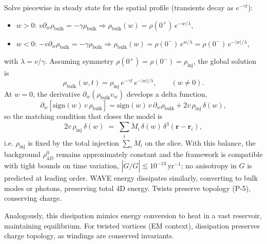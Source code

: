 Solve piecewise in steady state for the spatial profile (transients decay as $e^{-\gamma t}$):
\begin{itemize}
\item $w>0$: $v\partial_w\rho_{\text{bulk}}=-\gamma\rho_{\text{bulk}}\Rightarrow \rho_{\text{bulk}}(w)=\rho(0^+)\,e^{-w/\lambda}$,
\item $w<0$: $-v\partial_w\rho_{\text{bulk}}=-\gamma\rho_{\text{bulk}}\Rightarrow \rho_{\text{bulk}}(w)=\rho(0^-)\,e^{w/\lambda}=\rho(0^-)\,e^{-|w|/\lambda}$,
\end{itemize}
with $\lambda=v/\gamma$. Assuming symmetry $\rho(0^+)=\rho(0^-)=\rho_{\text{inj}}$, the global solution is
\begin{equation}
\rho_{\text{bulk}}(w,t)=\rho_{\text{inj}}\,e^{-\gamma t}\,e^{-|w|/\lambda},\qquad (w\neq 0).
\end{equation}
At $w=0$, the derivative $\partial_w(\rho_{\text{bulk}} v_w)$ develops a delta function,
\begin{equation}
\partial_w\!\left[\mathrm{sign}(w)\,v\,\rho_{\text{bulk}}\right]
= \mathrm{sign}(w)\,v\,\partial_w\rho_{\text{bulk}} + 2v\,\rho_{\text{inj}}\,\delta(w),
\end{equation}
so the matching condition that closes the model is
\begin{equation}
2v\,\rho_{\text{inj}}\,\delta(w)\;=\;\sum_i \dot M_i\,\delta(w)\,\delta^3(\mathbf r-\mathbf r_i),
\end{equation}
i.e. $\rho_{\text{inj}}$ is fixed by the total injection $\sum_i\dot M_i$ on the slice. With this balance, the background $\rho_{4D}^0$ remains approximately constant and the framework is compatible with tight bounds on time variation, $|\dot G/G|\lesssim 10^{-13}\,\mathrm{yr}^{-1}$; no anisotropy in $G$ is predicted at leading order. WAVE energy dissipates similarly, converting to bulk modes or photons, preserving total 4D energy. Twists preserve topology (P-5), conserving charge.

Analogously, this dissipation mimics energy conversion to heat in a vast reservoir, maintaining equilibrium. For twisted vortices (EM context), dissipation preserves charge topology, as windings are conserved invariants.

